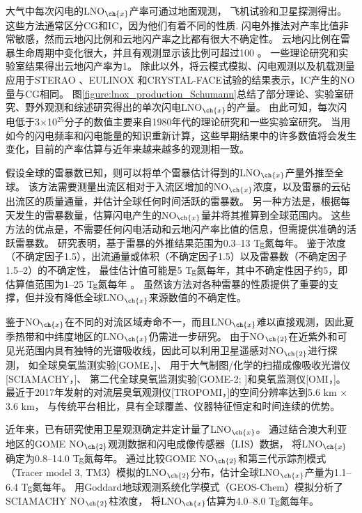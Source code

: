大气中每次闪电的LNO$_{\ch{x}}$产率可通过地面观测\citep{Noxon.1976}，
飞机试验\citep{Chameides.1987}和卫星探测\citep{Beirle.2004}得出。
这些方法通常区分CG和IC，因为他们有着不同的性质.
闪电外推法对产率比值非常敏感\citep{Bond.2002}，然而云地闪比例和云地闪产率之比都有很大不确定性。
云地闪比例在雷暴生命周期中变化很大，并且有观测显示该比例可超过100 \citep{Dye.2000,DeCaria.2005,Ott.2007}。
一些理论研究\citep{Cooray.1997}和实验室结果\citep{Cooray.2005}得出云地闪产率为1。
除此以外，将云模式模拟、闪电观测以及机载测量应用于STERAO \citep{DeCaria.2000}、EULINOX \citep{Fehr.2004}和CRYSTAL-FACE试验的结果表示，IC产生的NO量与CG相同。
图\ref{figure:lnox_production_Schumann}总结了部分理论、实验室研究、野外观测和综述研究得出的单次闪电LNO$_{\ch{x}}$的产量。
由此可知，每次闪电低于3$\times$10$^{25}$分子的数值主要来自1980年代的理论研究和一些实验室研究。
当用如今的闪电频率和闪电能量的知识重新计算，这些早期结果中的许多数值将会发生变化，目前的产率估算与近年来越来越多的观测相一致。

假设全球的雷暴数已知，则可以将单个雷暴估计得到的LNO$_{\ch{x}}$产量外推至全球\citep{Chameides.1987,Huntrieser.1998,Huntrieser.2002}。
该方法需要测量出流区相对于入流区增加的NO$_{\ch{x}}$浓度，以及雷暴的云砧出流区的质量通量，并估计全球任何时间活跃的雷暴数。
另一种方法是，根据每天发生的雷暴数量，估算闪电产生的NO$_{\ch{x}}$量并将其推算到全球范围内\citep{Ridley.2004}。 这些方法的优点是，不需要任何闪电活动和云地闪产率比值的信息，但需提供准确的活跃雷暴数。
研究表明，基于雷暴的外推结果范围为0.3--13 Tg氮每年。
鉴于浓度（不确定因子1.5），出流通量或体积（不确定因子1.5）以及雷暴数（不确定因子1.5--2）的不确定性，
最佳估计值可能是5 Tg氮每年，其中不确定性因子约5，即估算值范围为1--25 Tg氮每年 \citep{Chameides.1987}。
虽然该方法对各种雷暴的性质提供了重要的支撑，但并没有降低全球LNO$_{\ch{x}}$来源数值的不确定性。


鉴于NO$_{\ch{x}}$在不同的对流区域寿命不一，而且LNO$_{\ch{x}}$难以直接观测，因此夏季热带和中纬度地区的LNO$_{\ch{x}}$仍需进一步研究。
由于NO$_{\ch{2}}$在近紫外和可见光范围内具有独特的光谱吸收线，因此可以利用卫星遥感对NO$_{\ch{2}}$进行探测\citep{Platt.1983}，
如全球臭氧监测实验[GOME，\citet{Burrows.1999}]、
用于大气制图/化学的扫描成像吸收光谱仪[SCIAMACHY，\citet{Bovensmann.1999}]、
第二代全球臭氧监测实验[GOME-2; \citet{Callies.2000}]和臭氧监测仪[OMI，\citet{Levelt.2006}]。
最近于2017年发射的对流层臭氧观测仪[TROPOMI，\citet{Veefkind.2012}]的空间分辨率达到5.6 km $\times$ 3.6 km，
与传统平台相比，具有全球覆盖、仪器特征恒定和时间连续的优势。

近年来，已有研究使用卫星观测确定并定计量了LNO$_{\ch{x}}$。
\citet{Beirle.2004}通过结合澳大利亚地区的GOME NO$_{\ch{2}}$观测数据和闪电成像传感器（LIS）数据，
将LNO$_{\ch{x}}$确定为0.8--14.0 Tg氮每年。
\citet{Boersma.2005}通过比较GOME NO$_{\ch{2}}$和第三代示踪剂模式（Tracer model 3, TM3）模拟的LNO$_{\ch{2}}$分布，估计全球LNO$_{\ch{x}}$产量为1.1--6.4 Tg氮每年。
\citet{Martin.2007a}用Goddard地球观测系统化学模式（GEOS-Chem）模拟分析了SCIAMACHY NO$_{\ch{2}}$柱浓度，
将LNO$_{\ch{x}}$估算为4.0--8.0 Tg氮每年。

